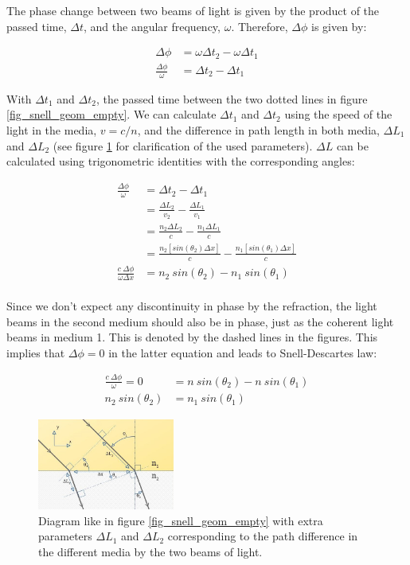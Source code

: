 \documentclass{article}
\begin{document}
The phase change between two beams of light is given by the product of the passed time, $\Delta t$, and the angular frequency, $\omega$. Therefore, $\Delta \phi$ is given by:

\begin{align*}
	\Delta \phi &= \omega \Delta t_2 - \omega \Delta t_1 \\
	\frac{\Delta \phi}{\omega} &= \Delta t_2 - \Delta t_1
\end{align*}

With $\Delta t_1$ and $\Delta t_2$, the passed time between the two dotted lines in figure \ref{fig_snell_geom_empty}.
We can calculate $\Delta t_1$ and $\Delta t_2$ using the speed of the light in the media, $v = c/n$, and the difference in path length in both media, $\Delta L_1$ and $\Delta L_2$ (see figure \ref{fig_snell_geom} for clarification of the used parameters). $\Delta L$ can be calculated using trigonometric identities with the corresponding angles:

\begin{align*}
	\frac{\Delta \phi}{\omega} &= \Delta t_2 - \Delta t_1 \\
	&= \frac{\Delta L_2}{v_2} - \frac{\Delta L_1}{v_1} \\
	&= \frac{n_2 \Delta L_2}{c} - \frac{n_1 \Delta L_1}{c} \\
	&= \frac{n_2 [sin(\theta_2) \Delta x]}{c} - \frac{n_1 [sin(\theta_1) \Delta x]}{c} \\
	\frac{c \: \Delta \phi}{\omega \Delta x} &=  n_2 \: sin(\theta_2) - n_1 \: sin(\theta_1)   \\
\end{align*}

Since we don't expect any discontinuity in phase by the refraction, the light beams in the second medium should also be in phase, just as the coherent light beams in medium 1. This is denoted by the dashed lines in the figures. This implies that $\Delta \phi = 0$ in the latter equation and leads to Snell-Descartes law:

\begin{align*}
	\frac{c \: \Delta \phi}{\omega} = 0 &=  n \: sin(\theta_2) - n \: sin(\theta_1) \\
	 n_2 \: sin(\theta_2) &= n_1 \: sin(\theta_1)
\end{align*}


\begin{figure}[h!]
	\centering
	\includegraphics[width=0.4\textwidth]{afbeeldingen/snell_geom.jpg}
	\caption{Diagram like in figure \ref{fig_snell_geom_empty} with extra parameters $\Delta L_1$ and $\Delta L_2$ corresponding to the path difference in the different media by the two beams of light.}
	\label{fig_snell_geom}
\end{figure}
\end{document}

